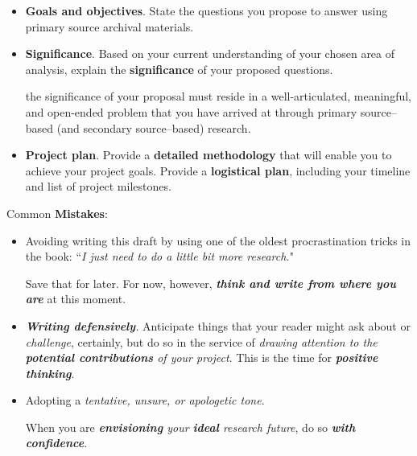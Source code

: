 \documentclass[11pt]{article}
\begin{document}
\begin{itemize}
\begin{exercise}
\begin{itemize}
\item \textbf{Goals and objectives}. State the questions you propose to answer using primary source archival materials.

\item \textbf{Significance}. Based on your current understanding of your chosen area of analysis, explain the \textbf{significance} of your proposed questions. 

the significance of your proposal must reside in a well-articulated, meaningful, and open-ended problem that you have arrived at through primary source– based (and secondary source–based) research.

\item  \textbf{Project plan}. Provide a \textbf{detailed methodology} that will enable you to achieve your project goals. Provide a \textbf{logistical plan}, including your timeline and list of project milestones.
\end{itemize}
\end{exercise}
Common \textbf{Mistakes}:
\begin{itemize}
\item Avoiding writing this draft by using one of the oldest procrastination tricks in the book: ``\emph{I just need to do a little bit more research.}" 

Save that for later. For now, however, \emph{\textbf{think and write from where you are}} at this moment.

\item \emph{\textbf{Writing defensively}.} Anticipate things that your reader might ask about or \emph{challenge}, certainly, but do so in the service of \emph{drawing attention to the \textbf{potential contributions} of your project}. This is the time for \emph{\textbf{positive thinking}}.

\item Adopting a \emph{tentative, unsure, or apologetic tone}. 

When you are \emph{\textbf{envisioning} your \textbf{ideal} research future}, do so \emph{\textbf{with confidence}}. 
\end{itemize}
\end{itemize}
\end{document}
